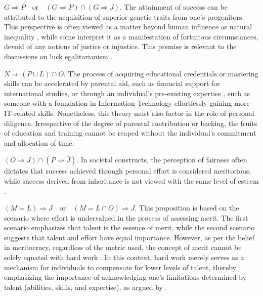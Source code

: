 \begin{premise*}[H2]\label{H2}
	$
	G \Rightarrow P \quad \text{or} \quad (G \Rightarrow P) \cap (G \Rightarrow J).
	$
	The attainment of success can be attributed to the acquisition of superior genetic traits from one’s progenitors. This perspective is often viewed as a matter beyond human influence as natural inequality \citep{aas2016natural}, while some interpret it as a manifestation of fortuitous circumstances, devoid of any notions of justice or injustice. This premise is relevant to the discussions on luck egalitarianism \citep{knight2013luck}.
	
\end{premise*}

\begin{premise*}[H3]\label{H3}
	$
	N \Rightarrow (P \cup L) \cap O.
	$
	The process of acquiring educational credentials or mastering skills can be accelerated by parental aid, such as financial support for international studies, or through an individual’s pre-existing expertise \citep{meyers2013talent}, such as someone with a foundation in Information Technology effortlessly gaining more IT-related skills. Nonetheless, this theory must also factor in the role of personal diligence. Irrespective of the degree of parental contribution or backing, the fruits of education and training cannot be reaped without the individual’s commitment and allocation of time.
	
\end{premise*}

\begin{premise*}[H4]\label{H4}
	$
	(O \Rightarrow J) \cap (P \Rightarrow \bar{J}).
	$
	In societal constructs, the perception of fairness often dictates that success achieved through personal effort is considered meritorious, while success derived from inheritance is not viewed with the same level of esteem \citep{rowlingson2011deserving}.
	
\end{premise*}

\begin{conclusion*}[Q]\label{Q}
	$
	(M = L) \Rightarrow J \quad \text{or} \quad (M = L \cap O) \Rightarrow J.
	$
	This proposition is based on the scenario where effort is undervalued in the process of assessing merit. The first scenario emphasizes that talent is the essence of merit, while the second scenario suggests that talent and effort have equal importance. However, as per the belief in meritocracy, regardless of the metric used, the concept of merit cannot be solely equated with hard work \citep{clavero2023idea}. In this context, hard work merely serves as a mechanism for individuals to compensate for lower levels of talent, thereby emphasizing the importance of acknowledging one’s limitations determined by talent (abilities, skills, and expertise), as argued by \citet{chamorro2016talent}.
	
\end{conclusion*}

